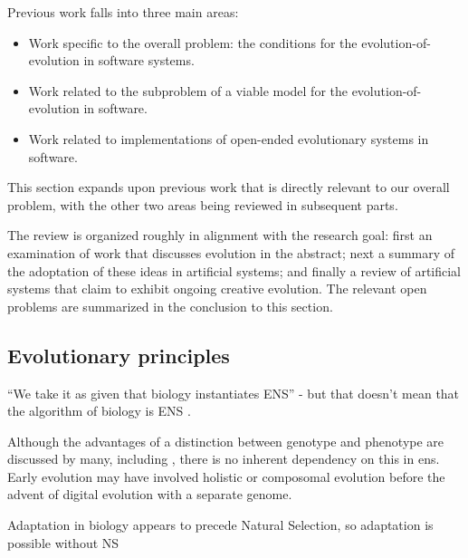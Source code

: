 Previous work falls into three main areas:
\begin{itemize}
	\item Work specific to the overall problem: the conditions for the evolution-of-evolution in software systems.
	\item Work related to the subproblem of a viable model for the evolution-of-evolution in software.
	\item Work related to implementations of open-ended evolutionary systems in software.
	\end{itemize}
	
This section expands upon previous work that is directly relevant to our overall problem, with the other two areas being reviewed in subsequent parts. 

The review is organized roughly in alignment with the research goal: first an examination of work that discusses evolution in the abstract; next a summary of the adoptation of these ideas in artificial systems; and finally a review of artificial systems that claim to exhibit ongoing creative evolution. The relevant open problems are summarized in the conclusion to this section.

\subsection{Evolutionary principles}

``We take it as given that biology instantiates ENS'' - but that doesn't mean that the algorithm of biology is ENS \autocite{Watson2012}.

Although the advantages of a distinction between genotype and phenotype are discussed by many, including \autocite[section 7.2.3]{Taylor1999}, there is no inherent dependency on this in \gls{ens}. Early evolution may have involved holistic or composomal evolution before the advent of digital evolution with a separate genome.

Adaptation in biology appears to precede Natural Selection, so adaptation is possible without NS \autocite{Watson2010}	      	      	



